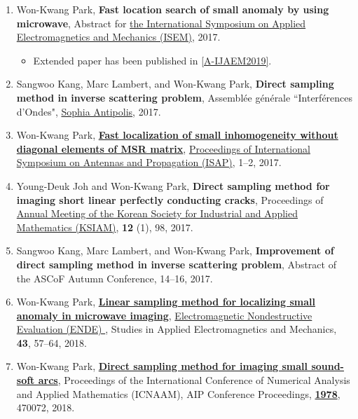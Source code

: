 \documentclass[10pt,A4]{article}
\begin{document}
\begin{enumerate}
\item\label{C-ISEM2017} Won-Kwang Park, \textbf{Fast location search of small anomaly by using microwave}, Abstract for \href{http://www.isem2017.org/}{the  International Symposium on Applied Electromagnetics and Mechanics (ISEM)}, 2017.
\begin{itemize}
\item Extended paper has been published in \ref{A-IJAEM2019}.
\end{itemize}
\item\label{C-GDRONDES2017}Sangwoo Kang, Marc Lambert, and Won-Kwang Park, \textbf{Direct sampling method in inverse scattering problem}, Assembl{\'e}e g{\'e}n{\'e}rale ``Interf{\'e}rences d'Ondes", \href{https://www.sophia-antipolis.fr}{Sophia Antipolis}, 2017.
\item\label{C-ISAP2017} Won-Kwang Park, \href{https://doi.org/10.1109/ISANP.2017.8228715}{\textbf{Fast localization of small inhomogeneity without diagonal elements of MSR matrix}}, \href{http://ieeexplore.ieee.org/xpl/mostRecentIssue.jsp?punumber=8170167}{Proceedings of International Symposium on Antennas and Propagation (ISAP)}, 1--2, 2017.
\item\label{C-KSIAM2017}Young-Deuk Joh and Won-Kwang Park, \textbf{Direct sampling method for imaging short linear perfectly conducting cracks}, Proceedings of \href{http://ksiam.org/conference/201711/welcome.php}{Annual Meeting of the Korean Society for Industrial and Applied Mathematics (KSIAM)}, \textbf{12} (1), 98, 2017.
\item\label{C-ASCOF2017}Sangwoo Kang, Marc Lambert, and Won-Kwang Park, \textbf{Improvement of direct sampling method in inverse scattering problem}, Abstract of the ASCoF Autumn Conference, 14--16, 2017.
\item\label{C-ENDE2017} Won-Kwang Park, \href{http://dx.doi.org/10.3233/978-1-61499-836-5-57}{\textbf{Linear sampling method for localizing small anomaly in microwave imaging}}, \href{http://ebooks.iospress.nl/volume/electromagnetic-non-destructive-evaluation-xxi}{Electromagnetic Nondestructive Evaluation (ENDE) }, Studies in Applied Electromagnetics and Mechanics, \textbf{43}, 57--64, 2018.
\item\label{C-ICNAAM2018} Won-Kwang Park, \href{https://doi.org/10.1063/1.5044142}{\textbf{Direct sampling method for imaging small sound-soft arcs}}, Proceedings of the  International Conference of Numerical Analysis and Applied Mathematics (ICNAAM), AIP Conference Proceedings, \href{https://aip.scitation.org/toc/apc/1978/1}{\textbf{1978}}, 470072, 2018.

\end{enumerate}
\end{document}
